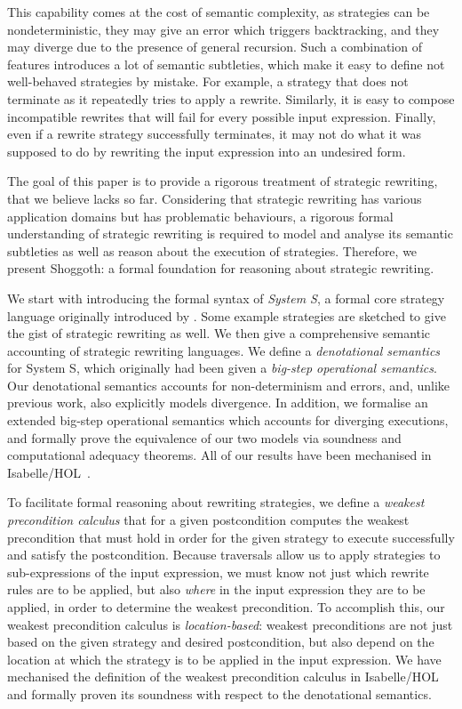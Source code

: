 This capability comes at the cost of semantic complexity, as strategies can be nondeterministic, they may give an error which triggers backtracking, and they may diverge due to the presence of general recursion. Such a combination of features introduces a lot of semantic subtleties, which make it
easy to define not well-behaved strategies by mistake. For example, a strategy that does not terminate as it repeatedly tries to apply a rewrite.
Similarly, it is easy to compose incompatible rewrites
that will fail for every possible input expression.
Finally, even if a rewrite strategy successfully terminates, it may not do what it was supposed to do by rewriting the input expression into an undesired form.

The goal of this paper is to provide a rigorous treatment of strategic rewriting, that we believe lacks so far. Considering that strategic rewriting has various application domains but has problematic behaviours, a rigorous formal understanding of strategic rewriting is required to model and analyse its semantic subtleties as well as reason about the execution of strategies. Therefore, we present Shoggoth: a formal foundation for reasoning about strategic rewriting.

We start with introducing the formal syntax of \emph{System S}, a formal core strategy language
originally introduced by \citet{VISSER1998422}. Some example strategies are sketched to give the gist of strategic rewriting as well. We then give a comprehensive semantic
accounting of strategic rewriting languages. We define a \emph{denotational semantics} for System
S, which originally had been given
a \emph{big-step operational semantics}. Our denotational semantics accounts for non-determinism and errors, and, unlike previous work, also explicitly models divergence.
In addition, we formalise an extended big-step operational semantics which accounts for diverging executions, and formally prove the equivalence of our two models via soundness and computational adequacy theorems. All of our results have been mechanised in Isabelle/HOL~\citep{NipkowPauWen:IsabelleTut:2002}.

To facilitate formal reasoning about rewriting strategies, we define a \emph{weakest precondition calculus} that for a given postcondition computes the weakest precondition that must hold in order for the given strategy to execute successfully and satisfy the postcondition. Because traversals allow us to apply strategies to sub-expressions of the input expression, we must know not just which rewrite rules are to be applied, but also \emph{where} in the input expression they are to be applied, in order to determine the weakest precondition. To accomplish this, our weakest precondition calculus is \emph{location-based}: weakest preconditions are not just based on the given strategy and desired postcondition, but also depend on the location at which the strategy is to be applied in the input expression. We have mechanised the definition of the weakest precondition calculus in Isabelle/HOL and formally proven its soundness with respect to the denotational semantics. 

